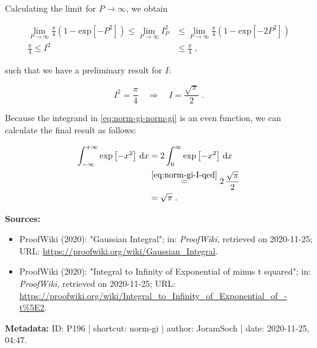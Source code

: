 \documentclass[a4paper,12pt,twoside]{book}
\begin{document}
Calculating the limit for $P \rightarrow \infty$, we obtain

\begin{equation} \label{eq:norm-gi-IP2-ineq-PC-int-lim}
\begin{split}
\lim\limits_{P \rightarrow \infty} \frac{\pi}{4} \left( 1 - \mathrm{exp}\left[ -P^2 \right] \right) \leq \lim\limits_{P \rightarrow \infty} I_P^2 &\leq \lim\limits_{P \rightarrow \infty} \frac{\pi}{4} \left( 1 - \mathrm{exp}\left[ -2 P^2 \right] \right) \\
\frac{\pi}{4} \leq I^2 &\leq \frac{\pi}{4} \; ,
\end{split}
\end{equation}

such that we have a preliminary result for $I$:

\begin{equation} \label{eq:norm-gi-I-qed}
I^2 = \frac{\pi}{4} \quad \Rightarrow \quad I = \frac{\sqrt{\pi}}{2} \; .
\end{equation}

Because the integrand in \eqref{eq:norm-gi-norm-gi} is an even function, we can calculate the final result as follows:

\begin{equation} \label{eq:norm-gi-norm-gi-qed}
\begin{split}
\int_{-\infty}^{+\infty} \mathrm{exp}\left[ -x^2 \right] \, \mathrm{d}x &= 2 \int_{0}^{\infty} \mathrm{exp}\left[ -x^2 \right] \, \mathrm{d}x \\
&\overset{\eqref{eq:norm-gi-I-qed}}{=} 2 \, \frac{\sqrt{\pi}}{2} \\
&= \sqrt{\pi} \; . 
\end{split}
\end{equation}


\vspace{1em}
\textbf{Sources:}
\begin{itemize}
\item ProofWiki (2020): "Gaussian Integral"; in: \textit{ProofWiki}, retrieved on 2020-11-25; URL: \url{https://proofwiki.org/wiki/Gaussian_Integral}.
\item ProofWiki (2020): "Integral to Infinity of Exponential of minus t squared"; in: \textit{ProofWiki}, retrieved on 2020-11-25; URL: \url{https://proofwiki.org/wiki/Integral_to_Infinity_of_Exponential_of_-t%5E2}.
\end{itemize}


\vspace{1em}
\textbf{Metadata:} ID: P196 | shortcut: norm-gi | author: JoramSoch | date: 2020-11-25, 04:47.
\vspace{1em}
\end{document}
